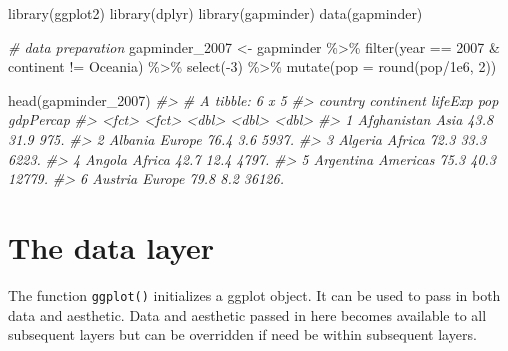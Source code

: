 \documentclass[
]{book}
\newenvironment{Shaded}{\begin{snugshade}}{\end{snugshade}}
\newcommand{\AttributeTok}[1]{\textcolor[rgb]{0.77,0.63,0.00}{#1}}
\newcommand{\CommentTok}[1]{\textcolor[rgb]{0.56,0.35,0.01}{\textit{#1}}}
\newcommand{\DecValTok}[1]{\textcolor[rgb]{0.00,0.00,0.81}{#1}}
\newcommand{\FloatTok}[1]{\textcolor[rgb]{0.00,0.00,0.81}{#1}}
\newcommand{\FunctionTok}[1]{\textcolor[rgb]{0.00,0.00,0.00}{#1}}
\newcommand{\NormalTok}[1]{#1}
\newcommand{\OtherTok}[1]{\textcolor[rgb]{0.56,0.35,0.01}{#1}}
\newcommand{\SpecialCharTok}[1]{\textcolor[rgb]{0.00,0.00,0.00}{#1}}
\newcommand{\StringTok}[1]{\textcolor[rgb]{0.31,0.60,0.02}{#1}}
\begin{document}
\begin{Shaded}
\begin{Highlighting}[]
\FunctionTok{library}\NormalTok{(ggplot2)}
\FunctionTok{library}\NormalTok{(dplyr)}
\FunctionTok{library}\NormalTok{(gapminder)}
\FunctionTok{data}\NormalTok{(gapminder)}

\CommentTok{\# data preparation}
\NormalTok{gapminder\_2007 }\OtherTok{\textless{}{-}}\NormalTok{ gapminder }\SpecialCharTok{\%\textgreater{}\%}
  \FunctionTok{filter}\NormalTok{(year }\SpecialCharTok{==} \StringTok{\textquotesingle{}2007\textquotesingle{}} \SpecialCharTok{\&}\NormalTok{ continent }\SpecialCharTok{!=} \StringTok{\textquotesingle{}Oceania\textquotesingle{}}\NormalTok{) }\SpecialCharTok{\%\textgreater{}\%}
  \FunctionTok{select}\NormalTok{(}\SpecialCharTok{{-}}\DecValTok{3}\NormalTok{) }\SpecialCharTok{\%\textgreater{}\%}
  \FunctionTok{mutate}\NormalTok{(}\AttributeTok{pop =} \FunctionTok{round}\NormalTok{(pop}\SpecialCharTok{/}\FloatTok{1e6}\NormalTok{, }\DecValTok{2}\NormalTok{))}

\FunctionTok{head}\NormalTok{(gapminder\_2007)}
\CommentTok{\#\textgreater{} \# A tibble: 6 x 5}
\CommentTok{\#\textgreater{}   country     continent lifeExp   pop gdpPercap}
\CommentTok{\#\textgreater{}   \textless{}fct\textgreater{}       \textless{}fct\textgreater{}       \textless{}dbl\textgreater{} \textless{}dbl\textgreater{}     \textless{}dbl\textgreater{}}
\CommentTok{\#\textgreater{} 1 Afghanistan Asia         43.8  31.9      975.}
\CommentTok{\#\textgreater{} 2 Albania     Europe       76.4   3.6     5937.}
\CommentTok{\#\textgreater{} 3 Algeria     Africa       72.3  33.3     6223.}
\CommentTok{\#\textgreater{} 4 Angola      Africa       42.7  12.4     4797.}
\CommentTok{\#\textgreater{} 5 Argentina   Americas     75.3  40.3    12779.}
\CommentTok{\#\textgreater{} 6 Austria     Europe       79.8   8.2    36126.}
\end{Highlighting}
\end{Shaded}

\hypertarget{the-data-layer}{%
\section{The data layer}\label{the-data-layer}}

The function \texttt{ggplot()} initializes a ggplot object. It can be used to pass in both data and aesthetic. Data and aesthetic passed in here becomes available to all subsequent layers but can be overridden if need be within subsequent layers.
\end{document}
